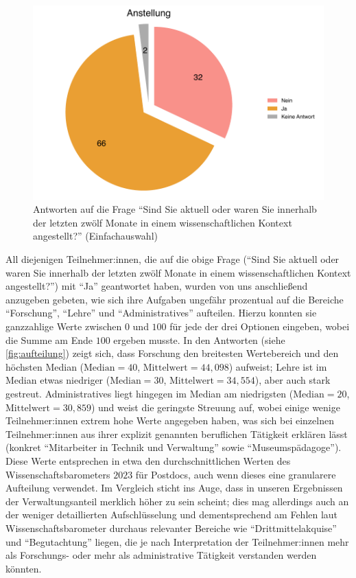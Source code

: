 \documentclass{scrartcl}
\begin{document}
\begin{figure}[ht]
   \includegraphics[width=1\textwidth]{anstellung.pdf}
   \caption{Antworten auf die Frage \enquote{Sind Sie aktuell oder waren Sie innerhalb der letzten zwölf Monate in einem wissenschaftlichen Kontext angestellt?} (Einfachauswahl)}
   \label{fig:anstellung}
\end{figure}

All diejenigen Teilnehmer:innen, die auf die obige Frage (\enquote{Sind Sie aktuell oder waren Sie innerhalb der letzten zwölf Monate in einem wissenschaftlichen Kontext angestellt?}) mit \enquote{Ja} geantwortet haben, wurden von uns anschließend anzugeben gebeten, wie sich ihre Aufgaben ungefähr prozentual auf die Bereiche \enquote{Forschung}, \enquote{Lehre} und \enquote{Administratives} aufteilen.
Hierzu konnten sie ganzzahlige Werte zwischen $0$ und $100$ für jede der drei Optionen eingeben, wobei die Summe am Ende $100$ ergeben musste.
In den Antworten (siehe \autoref{fig:aufteilung}) zeigt sich, dass Forschung den breitesten Wertebereich und den höchsten Median ($\text{Median} = 40$, $\text{Mittelwert} = 44,098$) aufweist; Lehre ist im Median etwas niedriger ($\text{Median} = 30$, $\text{Mittelwert} = 34,554$), aber auch stark gestreut.
Administratives liegt hingegen im Median am niedrigsten ($\text{Median} = 20$, $\text{Mittelwert} = 30,859$) und weist die geringste Streuung auf, wobei einige wenige Teilnehmer:innen extrem hohe Werte angegeben haben, was sich bei einzelnen Teilnehmer:innen aus ihrer explizit genannten beruflichen Tätigkeit erklären lässt (konkret \enquote{Mitarbeiter in Technik und Verwaltung} sowie \enquote{Museumspädagoge}).
Diese Werte entsprechen in etwa den durchschnittlichen Werten des Wissenschaftsbarometers $2023$ für Postdocs,\autocite[Vgl.][S.~14--15]{fabian_barometer_2024} auch wenn dieses eine granularere Aufteilung verwendet.
Im Vergleich sticht ins Auge, dass in unseren Ergebnissen der Verwaltungsanteil merklich höher zu sein scheint; dies mag allerdings auch an der weniger detaillierten Aufschlüsselung und dementsprechend am Fehlen laut Wissenschaftsbarometer durchaus relevanter Bereiche wie \enquote{Drittmittelakquise} und \enquote{Begutachtung} liegen, die je nach Interpretation der Teilnehmer:innen mehr als Forschungs- oder mehr als administrative Tätigkeit verstanden werden könnten.
\end{document}
